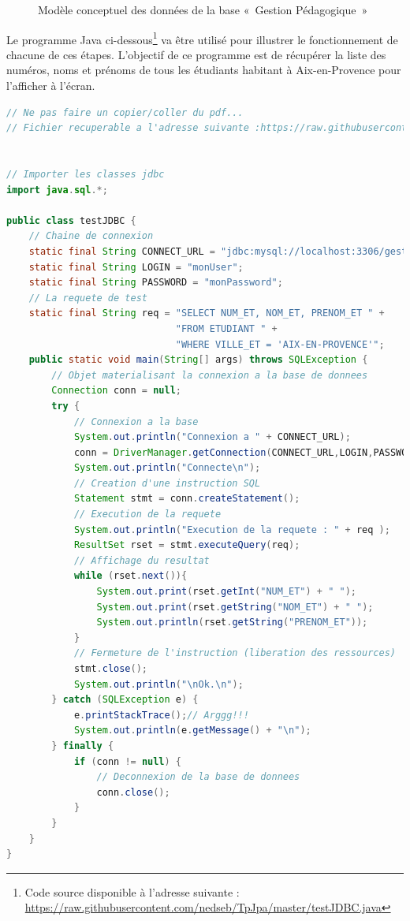 \documentclass[a4paper,11pt]{article}
\begin{document}
\begin{figure}
\caption{Modèle conceptuel des données de la base «~Gestion Pédagogique~»\label{mcd_gestion_peda}}
\end{figure}

Le programme Java ci-dessous\footnote{Code source disponible à l'adresse suivante : 
\url{https://raw.githubusercontent.com/nedseb/TpJpa/master/testJDBC.java}} va être utilisé pour illustrer le fonctionnement de chacune 
de ces étapes. L'objectif de ce programme est de récupérer la liste des numéros, noms et prénoms de tous les étudiants 
habitant à Aix-en-Provence pour l'afficher à l'écran.
\pagebreak
\begin{lstlisting}[language=java]
// Ne pas faire un copier/coller du pdf...
// Fichier recuperable a l'adresse suivante :https://raw.githubusercontent.com/nedseb/TpJpa/master/testJDBC.java


// Importer les classes jdbc
import java.sql.*;

public class testJDBC {
	// Chaine de connexion
	static final String CONNECT_URL = "jdbc:mysql://localhost:3306/gestionPedaBD";
	static final String LOGIN = "monUser";
	static final String PASSWORD = "monPassword";
	// La requete de test
	static final String req = "SELECT NUM_ET, NOM_ET, PRENOM_ET " +
	                          "FROM ETUDIANT " +
	                          "WHERE VILLE_ET = 'AIX-EN-PROVENCE'";                                     
	public static void main(String[] args) throws SQLException {
		// Objet materialisant la connexion a la base de donnees
		Connection conn = null;
		try {
			// Connexion a la base
			System.out.println("Connexion a " + CONNECT_URL);
			conn = DriverManager.getConnection(CONNECT_URL,LOGIN,PASSWORD);
			System.out.println("Connecte\n");
			// Creation d'une instruction SQL
			Statement stmt = conn.createStatement();
			// Execution de la requete
			System.out.println("Execution de la requete : " + req );
			ResultSet rset = stmt.executeQuery(req);
			// Affichage du resultat
			while (rset.next()){	
				System.out.print(rset.getInt("NUM_ET") + " ");
				System.out.print(rset.getString("NOM_ET") + " ");
				System.out.println(rset.getString("PRENOM_ET"));
			}
			// Fermeture de l'instruction (liberation des ressources)
			stmt.close();
			System.out.println("\nOk.\n");
		} catch (SQLException e) {
			e.printStackTrace();// Arggg!!!
			System.out.println(e.getMessage() + "\n");
		} finally {
			if (conn != null) {
				// Deconnexion de la base de donnees
				conn.close();
			}
		}
	}
}
\end{lstlisting}
\end{document}
